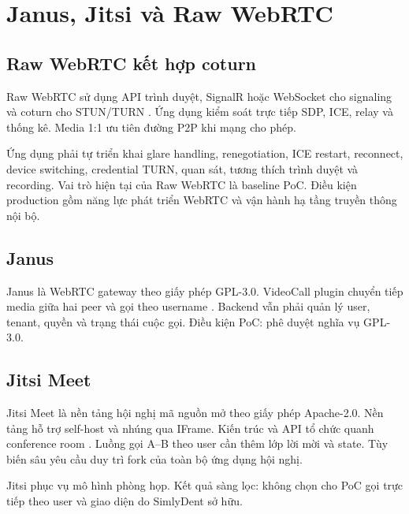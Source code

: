 \section{Janus, Jitsi và Raw WebRTC}

\subsection{Raw WebRTC kết hợp coturn}

Raw WebRTC sử dụng API trình duyệt, SignalR hoặc WebSocket cho signaling và coturn cho
STUN/TURN \cite{w3c-webrtc,coturn-repo}. Ứng dụng kiểm soát trực tiếp SDP, ICE, relay và
thống kê. Media 1:1 ưu tiên đường P2P khi mạng cho phép.

Ứng dụng phải tự triển khai glare handling, renegotiation, ICE restart, reconnect, device
switching, credential TURN, quan sát, tương thích trình duyệt và recording. Vai trò hiện
tại của Raw WebRTC là baseline PoC. Điều kiện production gồm năng lực phát triển WebRTC
và vận hành hạ tầng truyền thông nội bộ.

\subsection{Janus}

Janus là WebRTC gateway theo giấy phép GPL-3.0. VideoCall plugin chuyển tiếp media giữa
hai peer và gọi theo username \cite{janus-repo,janus-videocall}. Backend vẫn phải quản
lý user, tenant, quyền và trạng thái cuộc gọi. Điều kiện PoC: phê duyệt nghĩa vụ
GPL-3.0.

\subsection{Jitsi Meet}

Jitsi Meet là nền tảng hội nghị mã nguồn mở theo giấy phép Apache-2.0. Nền tảng hỗ trợ
self-host và nhúng qua IFrame. Kiến trúc và API tổ chức quanh conference room
\cite{jitsi-repo,jitsi-architecture}. Luồng gọi A--B theo user cần thêm lớp lời mời và
state. Tùy biến sâu yêu cầu duy trì fork của toàn bộ ứng dụng hội nghị.

Jitsi phục vụ mô hình phòng họp. Kết quả sàng lọc: không chọn cho PoC gọi trực tiếp theo
user và giao diện do SimlyDent sở hữu.

